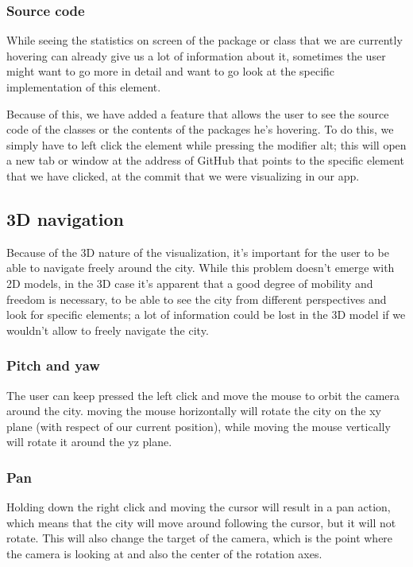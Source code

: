 \documentclass[]{usiinfbachelorproject}
\begin{document}
\subsubsection{Source code} \label{Source code}
While seeing the statistics on screen of the package or class that we are currently hovering can already give us a lot of information about it, sometimes the user might want to go more in detail and want to go look at the specific implementation of this element.

Because of this, we have added a feature that allows the user to see the source code of the classes or the contents of the packages he's hovering. To do this, we simply have to left click the element while pressing the modifier alt; this will open a new tab or window at the address of GitHub that points to the specific element that we have clicked, at the commit that we were visualizing in our app.

\subsection{3D navigation} \label{3D navigation}
Because of the 3D nature of the visualization, it's important for the user to be able to navigate freely around the city. While this problem doesn't emerge with 2D models, in the 3D case it's apparent that a good
degree of mobility and freedom is necessary, to be able to see the city from different perspectives and look for specific elements; a lot of information could be lost in the 3D model if we wouldn't allow to freely navigate the city.


\subsubsection{Pitch and yaw} \label{Pitch and yaw}
The user can keep pressed the left click and move the mouse to orbit the camera around the city. moving the mouse horizontally will rotate the city on the xy plane (with respect of our current position), while
moving the mouse vertically will rotate it around the yz plane.

\subsubsection{Pan} \label{Pan}
Holding down the right click and moving the cursor will result in a pan action, which means that the city will move around following the cursor, but it will not rotate. This will also change the target of the camera,
 which is the point where the camera is looking at and also the center of the rotation axes.
\end{document}

